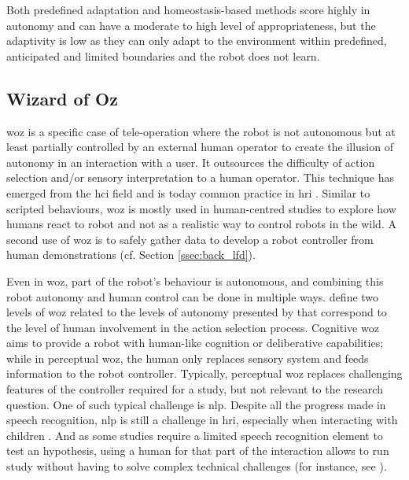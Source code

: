 	
	Both predefined adaptation and homeostasis-based methods score highly in autonomy and can have a moderate to high level of appropriateness, but the adaptivity is low as they can only adapt to the environment within predefined, anticipated and limited boundaries and the robot does not learn.

\subsection{Wizard of Oz} \label{subsec:WoZ}

	\acrfull{woz} is a specific case of tele-operation where the robot is not autonomous but at least partially controlled by an external human operator to create the illusion of autonomy in an interaction with a user. It outsources the difficulty of action selection and/or sensory interpretation to a human operator. This technique has emerged from the \gls{hci} field \citep{kelley1983empirical} and is today common practice in \gls{hri} \citep{riek2012wizard}. Similar to scripted behaviours, \gls{woz} is mostly used in human-centred studies to explore how humans react to robot and not as a realistic way to control robots in the wild. A second use of \gls{woz} is to safely gather data to develop a robot controller from human demonstrations (cf. Section \ref{ssec:back_lfd}).
	
	Even in \gls{woz}, part of the robot's behaviour is autonomous, and combining this robot autonomy and human control can be done in multiple ways. \cite{baxter2016characterising} define two levels of \gls{woz} related to the levels of autonomy presented by \cite{beer2014toward} that correspond to the level of human involvement in the action selection process. Cognitive \gls{woz} aims to provide a robot with human-like cognition or deliberative capabilities; while in perceptual \gls{woz}, the human only replaces sensory system and feeds information to the robot controller. Typically, perceptual \gls{woz} replaces challenging features of the controller required for a study, but not relevant to the research question. One of such typical challenge is \gls{nlp}. Despite all the progress made in speech recognition, \gls{nlp} is still a challenge in \gls{hri}, especially when interacting with children \citep{kennedy2017child}. And as some studies require a limited speech recognition element to test an hypothesis, using a human for that part of the interaction allows to run study without having to solve complex technical challenges (for instance, see \citealt{cakmak2010designing}).

